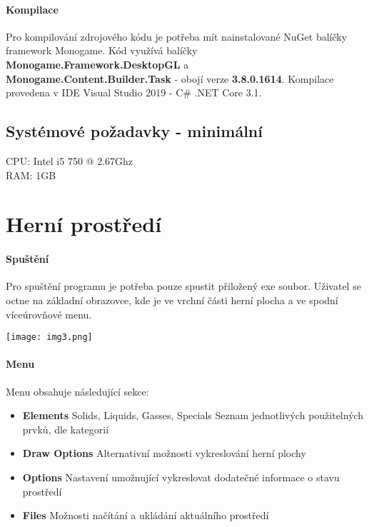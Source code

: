 \documentclass[a4paper, 12pt]{article}
\begin{document}
\paragraph{Kompilace}
Pro kompilování zdrojového kódu je potřeba mít nainstalované NuGet balíčky framework
Monogame. Kód využívá balíčky \\\textbf{Monogame.Framework.DesktopGL} a
\\\textbf{Monogame.Content.Builder.Task} - obojí verze \textbf{3.8.0.1614}. 
Kompilace provedena v IDE Visual Studio 2019 - C\# .NET Core 3.1.

\subsection{Systémové požadavky - minimální}
CPU: Intel i5 750 @ 2.67Ghz\\RAM: 1GB 

\newpage
\section{Herní prostředí}
\paragraph{Spuštění}
Pro spuštění programu je potřeba pouze spustit přiložený exe soubor.
Uživatel se octne na základní obrazovce, kde je ve vrchní části herní plocha a
ve spodní víceúrovňové menu.

\begin{center}
   \texttt{[image: img3.png]}
\end{center}

\paragraph{Menu}
Menu obsahuje následující sekce:
\begin{itemize}
    \item \textbf{Elements}
    \subitem Solids, Liquids, Gasses, Specials
    \subsubitem Seznam jednotlivých použitelných prvků, dle kategorií 
\item \textbf{Draw Options}
    \subitem Alternativní možnosti vykreslování herní plochy
\item \textbf{Options}
    \subitem Nastavení umožnující vykreslovat dodatečné informace o stavu
    prostředí
\item \textbf{Files}
    \subitem Možnosti načítání a ukládání aktuálního prostředí

\end{itemize}
\newpage
\end{document}
